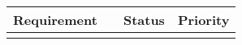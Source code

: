 \documentclass[11pt]{article}
\begin{document}
\begin{longtable}{|l|l|l|c|}

\hline
\bf Requirement & & \bf Status & \bf Priority\\
\hline
\endhead
\hline
\endfoot


\end{longtable}
\end{document}
